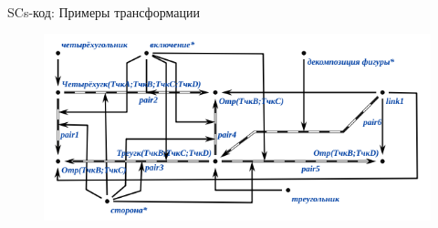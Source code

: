 \begin{frame}{\\SCs-код: Примеры трансформации}
	\topline
	\justifying
	\vspace*{\fill}\\
	\vspace{10mm}

	\begin{figure}[H]
		\includegraphics[scale=0.5]{./figures/intro/scs/scs_transf_example.png}
	\end{figure}
	
\end{frame}

